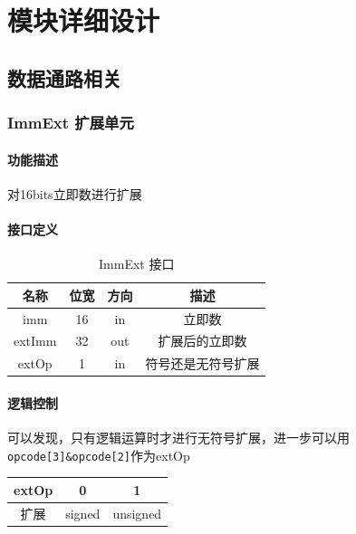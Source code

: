 \documentclass[UTF8]{ctexart}
\begin{document}
\section{模块详细设计}
\subsection{数据通路相关}
\subsubsection{ImmExt 扩展单元} 
\paragraph{功能描述} 
对16bits立即数进行扩展
\paragraph{接口定义}
\begin{table}[h]
    \centering
    \begin{tabular}{|c|c|c|c|}
        \hline  
        名称 & 位宽 & 方向 & 描述 \\ \hline 
        imm  & 16 & in & 立即数\\ \hline 
        extImm & 32 & out & 扩展后的立即数 \\ \hline
        extOp & 1 & in & 符号还是无符号扩展\\ \hline
    \end{tabular}
    \caption{ImmExt 接口}
\end{table}

\paragraph{逻辑控制}
可以发现，只有逻辑运算时才进行无符号扩展，进一步可以用\texttt{opcode[3]&opcode[2]}作为extOp
\begin{table}[h]
    \centering
    \begin{tabular}{|c|c|c|}
        \hline
        extOp & 0 & 1 \\ \hline
        扩展  & signed & unsigned \\ \hline
    \end{tabular}
\end{table} \\
\end{document}
